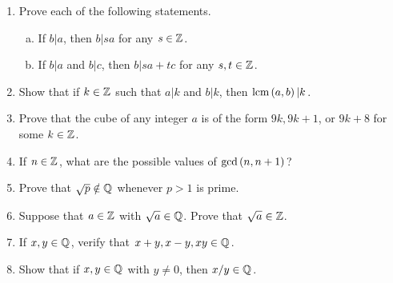 \documentclass[11pt,fleqn,dvipsnames,usenames]{article}
\renewcommand{\headrulewidth}{1pt}
\begin{document}
\fancyhead[L]{\course}
\fancyhead[R]{\term}
\renewcommand{\headrulewidth}{0.4pt}

\begin{enumerate}
\item Prove each of the following statements.
\begin{enumerate}[(a)]
\item If $b|a$, then $b|sa$ for any $s\in\mathbb{Z}$.
\item If $b|a$ and $b|c$, then $b|sa+tc$ for any $s,t\in\mathbb{Z}$.
\end{enumerate}
\item Show that if $k\in\mathbb{Z}$ such that $a|k$ and $b|k$, then $\text{lcm}\left(a, b\right)|k$.
\item Prove that the cube of any integer $a$ is of the form $9k, 9k+1$, or $9k+8$ for some $k\in\mathbb{Z}$.
\item If $n\in \mathbb{Z}$, what are the possible values of $\text{gcd}\left(n, n+1\right)$?
%
\item Prove that $\sqrt{p}\notin\mathbb{Q}$ whenever $p>1$ is prime.
\item Suppose that $a\in\mathbb{Z}$ with $\sqrt{a}\in \mathbb{Q}$.  Prove that $\sqrt{a}\in\mathbb{Z}$.
\item If $x,y\in\mathbb{Q}$, verify that $x+y, x-y, xy\in \mathbb{Q}$.
\item Show that if $x,y\in\mathbb{Q}$ with $y\neq 0$, then $x/y\in\mathbb{Q}$.
\end{enumerate}
\vsp
\end{document}
